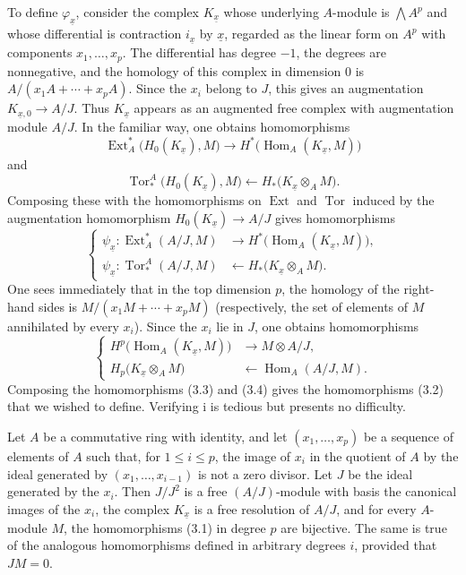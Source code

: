 To define $\varphi_{\underline{x}}$, consider the complex
$K_{\underline{x}}$ whose underlying $A$-module is $\bigwedge A^{p}$ and whose
differential is contraction $i_{\underline{x}}$ by $\underline{x}$, regarded
as the linear form on $A^{p}$ with components $x_1,\ldots,x_p$. The differential
has degree $-1$, the degrees are nonnegative, and the homology of this complex
in dimension $0$ is $A/(x_1A+\cdots+x_pA)$. Since the $x_i$ belong to $J$, this
gives an augmentation $K_{\underline{x},0}\longrightarrow A/J$. Thus
$K_{\underline{x}}$ appears as an augmented free complex with augmentation
module $A/J$. In the familiar way, one obtains homomorphisms
\[
\operatorname{Ext}_{A}^{*}\bigl(H_0(K_{\underline{x}}),M\bigr)
\longrightarrow
H^{*}\bigl(\operatorname{Hom}_{A}(K_{\underline{x}},M)\bigr)
\]
and
\[
\operatorname{Tor}_{*}^{A}\bigl(H_0(K_{\underline{x}}),M\bigr)
\longleftarrow
H_{*}\bigl(K_{\underline{x}}\otimes_A M\bigr).
\]
Composing these with the homomorphisms on $\operatorname{Ext}$ and
$\operatorname{Tor}$ induced by the augmentation homomorphism
$H_0(K_{\underline{x}})\longrightarrow A/J$ gives homomorphisms
\begin{equation}\tag{3.3}
\left\{
\begin{aligned}
\psi_{\underline{x}}:
\operatorname{Ext}_{A}^{*}(A/J,M)
&\longrightarrow H^{*}\bigl(\operatorname{Hom}_{A}(K_{\underline{x}},M)\bigr),\\
\psi_{\underline{x}}:
\operatorname{Tor}_{*}^{A}(A/J,M)
&\longleftarrow H_{*}\bigl(K_{\underline{x}}\otimes_A M\bigr).
\end{aligned}
\right.
\end{equation}
One sees immediately that in the top dimension $p$, the homology of the
right-hand sides is $M/(x_1M+\cdots+x_pM)$ (respectively, the set of elements of
$M$ annihilated by every $x_i$). Since the $x_i$ lie in $J$, one obtains
homomorphisms
\begin{equation}\tag{3.4}
\left\{
\begin{aligned}
H^{p}\bigl(\operatorname{Hom}_{A}(K_{\underline{x}},M)\bigr)
&\longrightarrow M\otimes A/J,\\
H_{p}\bigl(K_{\underline{x}}\otimes_A M\bigr)
&\longleftarrow\operatorname{Hom}_{A}(A/J,M).
\end{aligned}
\right.
\end{equation}
Composing the homomorphisms (3.3) and (3.4) gives the homomorphisms (3.2) that we
wished to define. Verifying i is tedious but presents no difficulty.

 Let $A$ be a commutative ring with identity, and let
$(x_1,\ldots,x_p)$ be a sequence of elements of $A$ such that, for
$1\leq i\leq p$, the image of $x_i$ in the quotient of $A$ by the ideal
generated by $(x_1,\ldots,x_{i-1})$ is not a zero divisor. Let $J$ be the ideal
generated by the $x_i$. Then $J/J^{2}$ is a free $(A/J)$-module with basis the
canonical images of the $x_i$, the complex $K_{\underline{x}}$ is a free
resolution of $A/J$, and for every $A$-module $M$, the homomorphisms (3.1) in
degree $p$ are bijective. The same is true of the analogous homomorphisms
defined in arbitrary degrees $i$, provided that $J M=0$.

